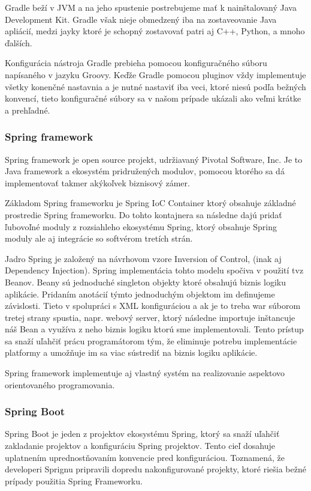 Gradle beží v JVM a na jeho spustenie postrebujeme mať k nainštalovaný Java Development Kit. Gradle však nieje obmedzený iba na zostaveovanie Java apliácií, medzi jayky ktoré je schopný zostavovať patri aj C++, Python, a mnoho ďalších.

Konfigurácia nástroja Gradle prebieha pomocou konfiguračného súboru napísaného v jazyku Groovy. Keďže Gradle pomocou pluginov vždy implementuje všetky konenčné nastavnia a je nutné nastaviť iba veci, ktoré niesú podľa bežných konvencí, tieto konfiguračné  súbory sa v našom prípade ukázali ako veľmi krátke a prehľadné. 

\subsubsection{Spring framework}
Spring framework je open source projekt, udržiavaný  Pivotal Software, Inc. Je to Java framework a ekosystém pridružených modulov, pomocou ktorého sa dá implementovať takmer akýkoľvek biznisový zámer.  

Základom Spring frameworku je Spring IoC Container ktorý obsahuje základné prostredie Spring frameworku. Do tohto kontajnera sa následne dajú pridať ľubovoľné moduly z rozsiahleho ekosystému Spring, ktorý obsahuje Spring moduly ale aj integrácie so softvérom tretích strán.

Jadro Spring je založený na návrhovom vzore Inversion of Control, (inak aj Dependency Injection). Spring implementácia tohto modelu spočiva v použití tvz Beanov. Beany sú jednoduché singleton objekty ktoré obsahujú biznis logiku aplikácie. Pridaním anotácií týmto jednoduchým objektom im definujeme závislosti. Tieto v spolupráci s XML konfiguráciou a ak je to treba war súborom tretej strany spustia, napr. webový server, ktorý následne importuje inštancuje náš Bean a využíva z neho biznis logiku ktorú sme implementovali. 
Tento prístup sa snaží uľahčiť prácu programátorom tým, že eliminuje potrebu implementácie platformy a umožňuje im sa viac sústrediť na biznis logiku aplikácie.  

Spring framework implementuje aj vlastný systém na realizovanie aspektovo orientovaného programovania.

\subsubsection{Spring Boot}
Spring Boot je jeden z projektov ekosystému Spring, ktorý sa snaží uľahčiť zakladanie projektov a konfiguráciu Spring projektov. Tento cieľ dosahuje uplatnením uprednostňovaním konvencie pred konfiguráciou. Toznamená, že developeri Sprignu pripravili dopredu nakonfigurované projekty, ktoré riešia bežné prípady použitia Spring Frameworku. 

